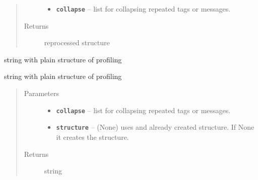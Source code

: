 \documentclass[letterpaper,10pt,english]{sphinxmanual}
\begin{document}
\begin{fulllineitems}
\begin{fulllineitems}
\begin{quote}
\begin{description}
\begin{itemize}
\item {} 
\textbf{\texttt{collapse}} -- list for collapsing repeated tags or messages.

\end{itemize}

\item[{Returns}] \leavevmode
reprocessed structure

\end{description}\end{quote}

\end{fulllineitems}


\begin{fulllineitems}
\label{RRtoolbox.lib:RRtoolbox.lib.root.profiler.string_lines}
string with plain structure of profiling

\end{fulllineitems}


\begin{fulllineitems}
\label{RRtoolbox.lib:RRtoolbox.lib.root.profiler.string_structured}
string with plain structure of profiling
\begin{quote}\begin{description}
\item[{Parameters}] \leavevmode\begin{itemize}
\item {} 
\textbf{\texttt{collapse}} -- list for collapsing repeated tags or messages.

\item {} 
\textbf{\texttt{structure}} -- (None) uses and already created structure. If None
it creates the structure.

\end{itemize}

\item[{Returns}] \leavevmode
string

\end{description}\end{quote}

\end{fulllineitems}



\end{fulllineitems}
\end{document}
